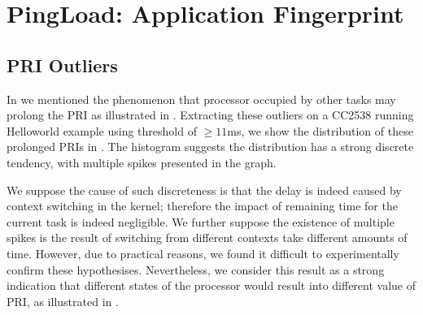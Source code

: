 \section{PingLoad: Application Fingerprint} \label{PingLoad}
\subsection{PRI Outliers}
In   we mentioned the phenomenon that processor occupied by other tasks may prolong the PRI as illustrated in  . Extracting these outliers on a CC2538 running Helloworld example using threshold of $\geq 11$ms, we show the distribution of these prolonged PRIs in . The histogram suggests the distribution has a strong discrete tendency, with multiple spikes presented in the graph.


We suppose the cause of such discreteness is that the delay is indeed caused by context switching in the kernel; therefore the impact of remaining time for the current task is indeed negligible. We further suppose the existence of multiple spikes is the result of switching from different contexts take different amounts of time. However, due to practical reasons, we found it difficult to experimentally confirm these hypothesises. Nevertheless, we consider this result as a strong indication that different states of the processor would result into different value of PRI, as illustrated in .

